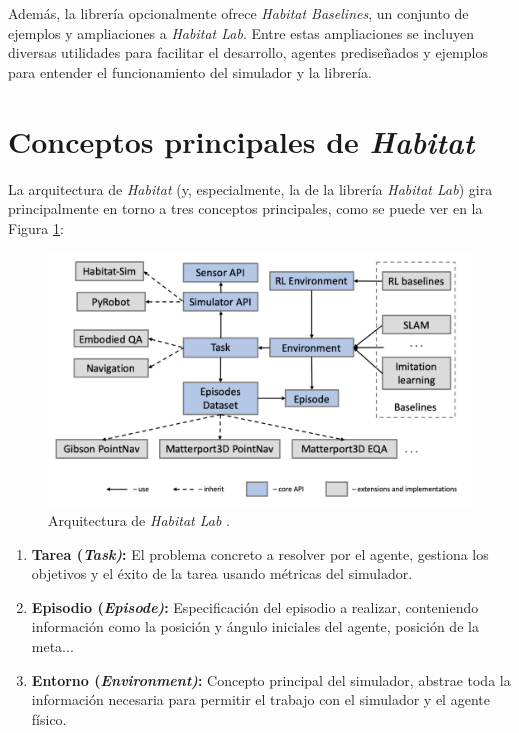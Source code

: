 Además, la librería opcionalmente ofrece \textit{Habitat Baselines}, un conjunto de ejemplos y ampliaciones a \textit{Habitat Lab}. Entre estas ampliaciones se incluyen diversas utilidades para facilitar el desarrollo, agentes prediseñados y ejemplos para entender el funcionamiento del simulador y la librería.


\section{Conceptos principales de \textit{Habitat}}

La arquitectura de \textit{Habitat} (y, especialmente, la de la librería \textit{Habitat Lab}) gira principalmente en torno a tres conceptos principales, como se puede ver en la Figura \ref{fig:chap4-habitat}:

\begin{figure}[h]
    \centering
    \includegraphics[width=\textwidth]{imagenes/cap4/habitat_lab_structure.png}
    \caption{Arquitectura de \textit{Habitat Lab} \cite{habitat19iccv}.}
    \label{fig:chap4-habitat}
\end{figure}

\begin{enumerate}
	\item \textbf{Tarea (\textit{Task)}:} El problema concreto a resolver por el agente, gestiona los objetivos y el éxito de la tarea usando métricas del simulador.
	\item \textbf{Episodio (\textit{Episode)}:} Especificación del episodio a realizar, conteniendo información como la posición y ángulo iniciales del agente, posición de la meta...
	\item \textbf{Entorno (\textit{Environment)}:} Concepto principal del simulador, abstrae toda la información necesaria para permitir el trabajo con el simulador y el agente físico.
\end{enumerate}

